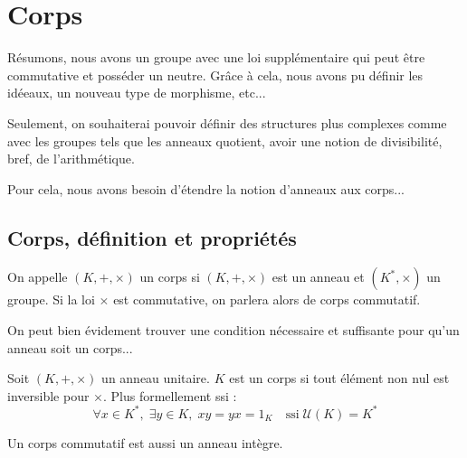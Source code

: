 \chapter{Corps}

\setlength{\parindent}{0pt}
\renewcommand{\labelitemi}{\textbullet} %


Résumons, nous avons un groupe avec une loi supplémentaire qui peut être commutative et posséder un neutre. 
Grâce à cela, nous avons pu définir les idéeaux, un nouveau type de morphisme, etc... 

Seulement, on souhaiterai pouvoir définir des structures plus complexes comme avec les groupes tels que les anneaux 
quotient, avoir une notion de divisibilité, bref, de l'arithmétique. 

Pour cela, nous avons besoin d'étendre la notion d'anneaux aux corps...


\section{Corps, définition et propriétés}

\begin{definition}[Corps]
    On appelle $(K, +, \times)$ un corps si $(K,+,\times)$ est un anneau et $(K^*, \times)$ un groupe. 
    Si la loi $\times$ est commutative, on parlera alors de corps commutatif. 
\end{definition}

On peut bien évidement trouver une condition nécessaire et suffisante pour qu'un anneau soit un corps...

\begin{proposition}
    Soit $(K, +, \times)$ un anneau unitaire. $K$ est un corps si tout élément non nul est inversible pour $\times$. 
    Plus formellement ssi : 
        \[ \forall x \in K^*, \; \exists y \in K, \; xy = yx = 1_K \quad \text{ssi} \; \mathcal{U}(K) = K^*\] 
\end{proposition}

\begin{proposition}
    Un corps commutatif est aussi un anneau intègre. 
\end{proposition}

